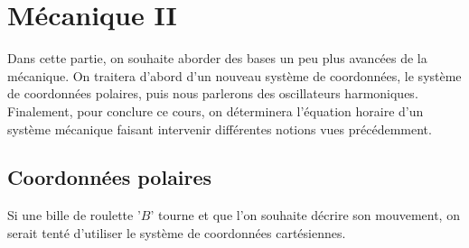 \documentclass{article}
\begin{document}
\section{Mécanique II}

\noindent Dans cette partie, on souhaite aborder des bases un peu plus avancées de la mécanique. On traitera d'abord d'un nouveau système de coordonnées, le système de coordonnées polaires, puis nous parlerons des oscillateurs harmoniques. Finalement, pour conclure ce cours, on déterminera l'équation horaire d'un système mécanique faisant intervenir différentes notions vues précédemment. 

\subsection{Coordonnées polaires}
Si une bille de roulette '$B$' tourne et que l'on souhaite décrire son mouvement, on serait tenté d'utiliser le système de coordonnées cartésiennes.
\end{document}
